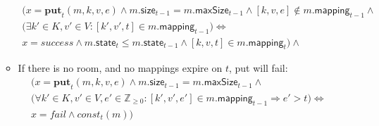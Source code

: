 \documentclass{article}
\renewcommand{\o}[1]{\ensuremath{\mathbf{#1}}}
\newcommand{\p}[1]{\ensuremath{\mathit{#1}}}
\newcommand{\s}[1]{\ensuremath{\mathsf{#1}}}
\newcommand{\nintset}{\ensuremath{\mathds{Z}_{\ge 0}}}
\begin{document}
\begin{itemize}
\begin{itemize}
\begin{gather}
      \Big(x=\o{put}_t(m, k, v, e) \wedge m.\s{size}_{t-1} = m.\s{maxSize}_{t-1} \wedge [k, v, e] \not\in m.\s{mapping}_{t-1} \wedge \nonumber\\
      \big(\exists k'\in K, v'\in V: [k', v', t] \in m.\s{mapping}_{t-1}\big) \Leftrightarrow\nonumber\\
      x=success \wedge m.\s{state}_t \le m.\s{state}_{t-1} \wedge [k, v, t] \in m.\s{mapping}_t\Big)\wedge
      \label{eq:put4}
    \end{gather}
  \item If there is no room, and no mappings expire on $t$, put will fail:
    \begin{gather}
      \Big(x=\o{put}_t(m, k, v, e) \wedge m.\s{size}_{t-1} = m.\s{maxSize}_{t-1} \wedge \nonumber\\
      \big(\forall k'\in K, v'\in V, e' \in \nintset: [k', v', e'] \in m.\s{mapping}_{t-1} \Rightarrow e' > t \big) \Leftrightarrow\nonumber\\
      x=fail \wedge \p{const}_t(m)\Big)
      \label{eq:put5}
    \end{gather}
  \end{itemize}

\end{itemize}
\end{document}
